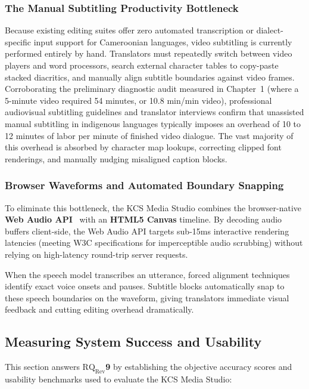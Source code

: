 \documentclass[a4paper,11pt]{article}
\begin{document}
\subsubsection{The Manual Subtitling Productivity Bottleneck}
\label{sec:chap2_bottleneck}
Because existing editing suites offer zero automated transcription or dialect-specific input support for Cameroonian languages, video subtitling is currently performed entirely by hand. Translators must repeatedly switch between video players and word processors, search external character tables to copy-paste stacked diacritics, and manually align subtitle boundaries against video frames. Corroborating the preliminary diagnostic audit measured in Chapter~1 (where a 5-minute video required 54 minutes, or 10.8 min/min video), professional audiovisual subtitling guidelines and translator interviews confirm that unassisted manual subtitling in indigenous languages typically imposes an overhead of 10 to 12 minutes of labor per minute of finished video dialogue. The vast majority of this overhead is absorbed by character map lookups, correcting clipped font renderings, and manually nudging misaligned caption blocks.

\subsubsection{Browser Waveforms and Automated Boundary Snapping}
\label{sec:chap2_snapping}
To eliminate this bottleneck, the KCS Media Studio combines the browser-native \textbf{Web Audio API}~\cite{w3c2021webaudio} with an \textbf{HTML5 Canvas} timeline. By decoding audio buffers client-side, the Web Audio API targets sub-15ms interactive rendering latencies (meeting W3C specifications for imperceptible audio scrubbing) without relying on high-latency round-trip server requests.

When the speech model transcribes an utterance, forced alignment techniques~\cite{kurzinger2020ctc, mcauliffe2017montreal} identify exact voice onsets and pauses. Subtitle blocks automatically snap to these speech boundaries on the waveform, giving translators immediate visual feedback and cutting editing overhead dramatically.

\subsection{Measuring System Success and Usability}
\label{sec:chap2_eval}

This section answers \textbf{$\text{RQ}_{\text{Rev}}$9} by establishing the objective accuracy scores and usability benchmarks used to evaluate the KCS Media Studio:
\end{document}
